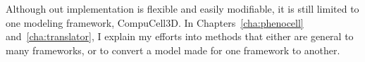 Although out implementation is flexible and easily modifiable, it is still limited to one modeling framework, CompuCell3D. In Chapters~\ref{cha:phenocell} and~\ref{cha:translator}, I explain my efforts into methods that either are general to many frameworks, or to convert a model made for one framework to another.

